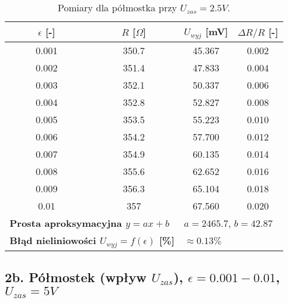 \documentclass[12pt, a4paper]{article}
\begin{document}
	\begin{table}[H]
		\centering
		\caption{Pomiary dla półmostka przy $U_{zas} = 2.5 V$.}
		\begin{tabular}{cccc}
			\toprule
			$\epsilon$ [-] & $R$ [$\Omega$] & $U_{wyj}$ [mV] & $\Delta R/R$ [-] \\
			\midrule
			0.001 & 350.7 & 45.367 & 0.002 \\
			0.002 & 351.4 & 47.833 & 0.004 \\
			0.003 & 352.1 & 50.337 & 0.006 \\
			0.004 & 352.8 & 52.827 & 0.008 \\
			0.005 & 353.5 & 55.223 & 0.010 \\
			0.006 & 354.2 & 57.700 & 0.012 \\
			0.007 & 354.9 & 60.135 & 0.014 \\
			0.008 & 355.6 & 62.652 & 0.016 \\
			0.009 & 356.3 & 65.104 & 0.018 \\
			0.01 & 357 & 67.560 & 0.020 \\
			\midrule
			\multicolumn{2}{l}{\textbf{Prosta aproksymacyjna $y = ax + b$}} & \multicolumn{2}{l}{$a = 2465.7$, $b = 42.87$} \\
			\multicolumn{2}{l}{\textbf{Błąd nieliniowości $U_{wyj} = f(\epsilon)$ [\%]}} & \multicolumn{2}{l}{$\approx 0.13 \%$} \\
			\bottomrule
		\end{tabular}
	\end{table}
	
	\subsection{2b. Półmostek (wpływ $U_{zas}$), $\epsilon = 0.001-0.01$, $U_{zas} = 5 V$}
	
\end{document}
